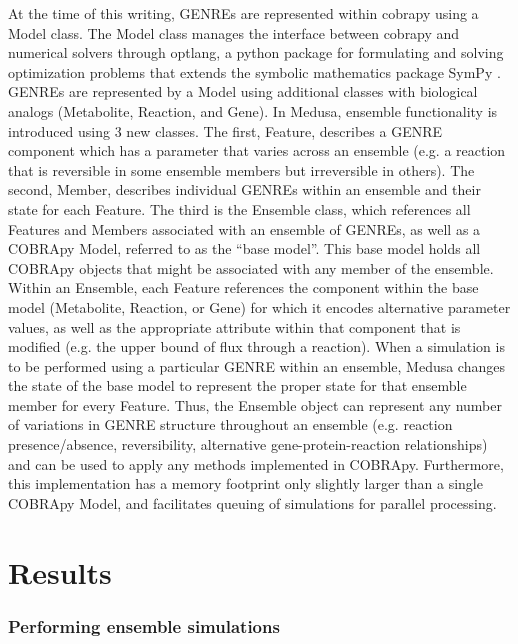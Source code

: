 \documentclass[11pt,twocolumn,notitlepage,openany,twoside]{book}
\begin{document}
\begin{refsection}
At the time of this writing, GENREs are represented within cobrapy using a Model class. The Model class manages the interface between cobrapy and numerical solvers through optlang, a python package for formulating and solving optimization problems that extends the symbolic mathematics package SymPy \cite{Jensen2016-nu,Meurer2017-mu}. GENREs are represented by a Model using additional classes with biological analogs (Metabolite, Reaction, and Gene). In Medusa, ensemble functionality is introduced using 3 new classes. The first, Feature, describes a GENRE component which has a parameter that varies across an ensemble (e.g. a reaction that is reversible in some ensemble members but irreversible in others). The second, Member, describes individual GENREs within an ensemble and their state for each Feature. The third is the Ensemble class, which references all Features and Members associated with an ensemble of GENREs, as well as a COBRApy Model, referred to as the “base model”. This base model holds all COBRApy objects that might be associated with any member of the ensemble. Within an Ensemble, each Feature references the component within the base model (Metabolite, Reaction, or Gene) for which it encodes alternative parameter values, as well as the appropriate attribute within that component that is modified (e.g. the upper bound of flux through a reaction). When a simulation is to be performed using a particular GENRE within an ensemble, Medusa changes the state of the base model to represent the proper state for that ensemble member for every Feature. Thus, the Ensemble object can represent any number of variations in GENRE structure throughout an ensemble (e.g. reaction presence/absence, reversibility, alternative gene-protein-reaction relationships) and can be used to apply any methods implemented in COBRApy. Furthermore, this implementation has a memory footprint only slightly larger than a single COBRApy Model, and facilitates queuing of simulations for parallel processing.

\section{Results}
\subsubsection{Performing ensemble simulations}


\end{refsection}
\end{document}
